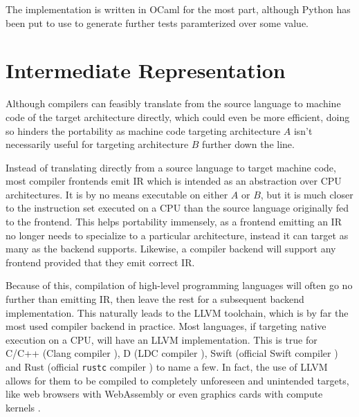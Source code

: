 \documentclass{article}
\begin{document}
The implementation is written in OCaml for the most part, although  Python has been put to use to generate further tests paramterized over some value.%







\section{Intermediate Representation}


Although compilers can feasibly translate from the source language to machine code of the target architecture directly, which could even be more efficient, doing so hinders the portability as machine code targeting architecture \(A\) isn't necessarily useful for targeting architecture \(B\) further down the line.

Instead of translating directly from a source language to target machine code, most compiler frontends emit IR which is intended as an abstraction over CPU architectures. %
It is by no means executable on either \(A\) or \(B\), but it is much closer to the instruction set executed on a CPU than the source language originally fed to the frontend.  This helps portability immensely, as a frontend emitting an IR no longer needs to specialize to a particular architecture, instead it can target as many as the backend supports.
Likewise, a compiler backend will support any frontend provided that they emit correct IR.

Because of this, compilation of high-level programming languages will often go no further than emitting IR, then leave the rest for a subsequent backend implementation. This naturally leads to the LLVM toolchain, which is by far the most used compiler backend in practice. Most languages, if targeting native execution on a CPU, will have an LLVM implementation. This is true for C/C++ (Clang compiler \cite{clang}), D (LDC compiler \cite{dlang}), Swift (official Swift compiler \cite{swift}) and Rust (official \texttt{rustc} compiler \cite{rustc}) to name a few. In fact, the use of LLVM allows for them to be compiled to completely unforeseen and unintended targets, like web browsers with WebAssembly or even graphics cards with compute kernels \cite{backend}.
\end{document}
